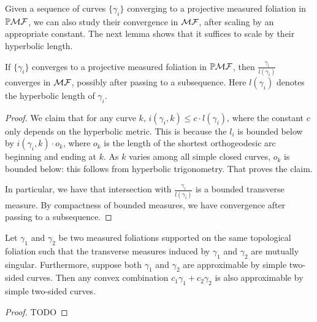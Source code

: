 \documentclass[12pt, reqno]{amsart}
\begin{document}
Given a sequence of curves $\{\gamma_i\}$ converging to a projective measured foliation in $\mathbb{P}\mathcal{MF}$, we can also study their convergence in $\mathcal{MF}$, after scaling by an appropriate constant.
The next lemma shows that it suffices to scale by their hyperbolic length.
\begin{lemma}
  \label{lem:scaling-lemma}
  If $\{\gamma_i\}$ converges to a projective measured foliation in $\mathbb{P}\mathcal{MF}$, then $\displaystyle \frac{\gamma_i}{l(\gamma_i)}$ converges in $\mathcal{MF}$, possibly after passing to a subsequence. Here $l(\gamma_i)$ denotes the hyperbolic length of $\gamma_i$.
\end{lemma}
\begin{proof}
  We claim that for any curve $k$, $i(\gamma_i, k) \leq c \cdot l(\gamma_i)$, where the constant $c$ only depends on the hyperbolic metric.
  This is because the $l_i$ is bounded below by $i(\gamma_i, k) \cdot o_k$, where $o_k$ is the length of the shortest orthogeodesic arc beginning and ending at $k$.
  As $k$ varies among all simple closed curves, $o_k$ is bounded below: this follows from hyperbolic trigonometry.
  That proves the claim.

  In particular, we have that intersection with $\displaystyle \frac{\gamma_i}{l(\gamma_i)}$ is a bounded transverse measure.
  By compactness of bounded measures, we have convergence after passing to a subsequence.
\end{proof}

\begin{lemma}
  \label{lem:convex-combinations}
  Let $\gamma_1$ and $\gamma_2$ be two measured foliations supported on the same topological foliation such that the transverse measures induced by $\gamma_1$ and $\gamma_2$ are mutually singular.
  Furthermore, suppose both $\gamma_1$ and $\gamma_2$ are approximable by simple two-sided curves.
  Then any convex combination $c_1 \gamma_1 + c_2\gamma_2$ is also approximable by simple two-sided curves.
\end{lemma}

\begin{proof}
  TODO
\end{proof}
\end{document}
